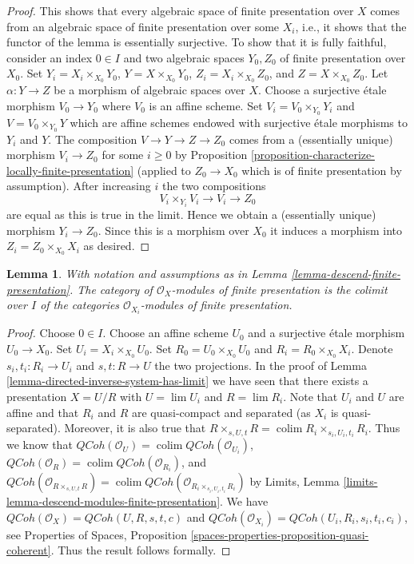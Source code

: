 \documentclass{stacks-project}
\theoremstyle{plain}
\newtheorem{lemma}[subsection]{Lemma}
\theoremstyle{definition}
\theoremstyle{remark}
\numberwithin{equation}{subsection}
\def\lim{\mathop{\mathrm{lim}}\nolimits}
\def\colim{\mathop{\mathrm{colim}}\nolimits}
\def\QCoh{\mathit{QCoh}}
\begin{document}
\begin{proof}
\medskip\noindent
This shows that every algebraic space of finite presentation over $X$ comes
from an algebraic space of finite presentation over some $X_i$, i.e.,
it shows that the functor of the lemma is essentially surjective. To
show that it is fully faithful, consider an index $0 \in I$ and two
algebraic spaces $Y_0, Z_0$ of finite presentation over $X_0$.
Set $Y_i = X_i \times_{X_0} Y_0$, $Y = X \times_{X_0} Y_0$,
$Z_i = X_i \times_{X_0} Z_0$, and $Z = X \times_{X_0} Z_0$. Let
$\alpha : Y \to Z$ be a morphism of algebraic spaces over $X$.
Choose a surjective \'etale morphism $V_0 \to Y_0$ where $V_0$ is
an affine scheme. Set $V_i = V_0 \times_{Y_0} Y_i$ and
$V = V_0 \times_{Y_0} Y$ which are affine schemes endowed with
surjective \'etale morphisms to $Y_i$ and $Y$. The composition
$V \to Y \to Z \to Z_0$ comes from a (essentially unique) morphism
$V_i \to Z_0$ for some $i \geq 0$ by
Proposition \ref{proposition-characterize-locally-finite-presentation}
(applied to $Z_0 \to X_0$ which is of finite presentation by assumption).
After increasing $i$ the two compositions
$$
V_i \times_{Y_i} V_i \to V_i \to Z_0
$$
are equal as this is true in the limit. Hence we obtain a (essentially unique)
morphism $Y_i \to Z_0$. Since this is a morphism over $X_0$
it induces a morphism into $Z_i = Z_0 \times_{X_0} X_i$ as desired.
\end{proof}

\begin{lemma}
\label{lemma-descend-modules-finite-presentation}
With notation and assumptions as in
Lemma \ref{lemma-descend-finite-presentation}.
The category of $\mathcal{O}_X$-modules of finite presentation is the
colimit over $I$ of the categories $\mathcal{O}_{X_i}$-modules of finite
presentation.
\end{lemma}

\begin{proof}
Choose $0 \in I$. Choose an affine scheme $U_0$ and a surjective
\'etale morphism $U_0 \to X_0$. Set $U_i = X_i \times_{X_0} U_0$.
Set $R_0 = U_0 \times_{X_0} U_0$ and $R_i = R_0 \times_{X_0} X_i$.
Denote $s_i, t_i : R_i \to U_i$ and $s, t : R \to U$ the two
projections. In the proof of
Lemma \ref{lemma-directed-inverse-system-has-limit} we have
seen that there exists a presentation $X = U/R$ with
$U = \lim U_i$ and $R = \lim R_i$. Note that $U_i$ and $U$ are affine and
that $R_i$ and $R$ are quasi-compact and separated (as $X_i$ is
quasi-separated). Moreover, it is also true that
$R \times_{s, U, t} R = \colim R_i \times_{s_i, U_i, t_i} R_i$.
Thus we know that
$\QCoh(\mathcal{O}_U) = \colim \QCoh(\mathcal{O}_{U_i})$,
$\QCoh(\mathcal{O}_R) = \colim \QCoh(\mathcal{O}_{R_i})$,
and
$\QCoh(\mathcal{O}_{R \times_{s, U, t} R}) =
\colim \QCoh(\mathcal{O}_{R_i \times_{s_i, U_i, t_i} R_i})$ by
Limits, Lemma \ref{limits-lemma-descend-modules-finite-presentation}.
We have $\QCoh(\mathcal{O}_X) = \QCoh(U, R, s, t, c)$ and
$\QCoh(\mathcal{O}_{X_i}) = \QCoh(U_i, R_i, s_i, t_i, c_i)$,
see Properties of Spaces, Proposition
\ref{spaces-properties-proposition-quasi-coherent}.
Thus the result follows formally.
\end{proof}
\end{document}
